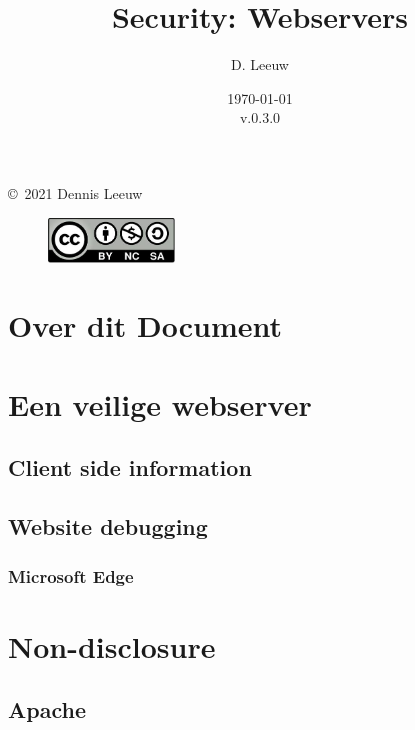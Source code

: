 \documentclass[a4paper,12pt,twoside,openright,titlepage]{book}
\author{D. Leeuw}
\title{Security: Webservers}
\date{\today\\v.0.3.0}
\begin{document}

\maketitle

\copyright\ 2021 Dennis Leeuw\\

\begin{figure}[H]
\includegraphics[width=0.3\textwidth]{CC-BY-SA-NC.png}
\end{figure}

\bigskip




\frontmatter
\chapter{Over dit Document}



\tableofcontents

\mainmatter

\chapter{Een veilige webserver}

\section{Client side information}

\section{Website debugging}

\subsection{Microsoft Edge}


\chapter{Non-disclosure}
\section{Apache}
\end{document}
